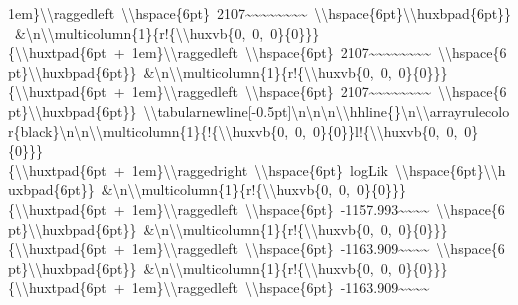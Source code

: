 \documentclass[
  english,
  man]{apa6}
\begin{document}
1em\}\textbackslash{}\textbackslash{}raggedleft\ \textbackslash{}\textbackslash{}hspace\{6pt\}\ 2107\textasciitilde{}\textasciitilde{}\textasciitilde{}\textasciitilde{}\textasciitilde{}\textasciitilde{}\textasciitilde{}\textasciitilde{}\ \textbackslash{}\textbackslash{}hspace\{6pt\}\textbackslash{}\textbackslash{}huxbpad\{6pt\}\}\ \&\textbackslash{}n\textbackslash{}\textbackslash{}multicolumn\{1\}\{r!\{\textbackslash{}\textbackslash{}huxvb\{0,\ 0,\ 0\}\{0\}\}\}\{\textbackslash{}\textbackslash{}huxtpad\{6pt\ +\ 1em\}\textbackslash{}\textbackslash{}raggedleft\ \textbackslash{}\textbackslash{}hspace\{6pt\}\ 2107\textasciitilde{}\textasciitilde{}\textasciitilde{}\textasciitilde{}\textasciitilde{}\textasciitilde{}\textasciitilde{}\textasciitilde{}\ \textbackslash{}\textbackslash{}hspace\{6pt\}\textbackslash{}\textbackslash{}huxbpad\{6pt\}\}\ \&\textbackslash{}n\textbackslash{}\textbackslash{}multicolumn\{1\}\{r!\{\textbackslash{}\textbackslash{}huxvb\{0,\ 0,\ 0\}\{0\}\}\}\{\textbackslash{}\textbackslash{}huxtpad\{6pt\ +\ 1em\}\textbackslash{}\textbackslash{}raggedleft\ \textbackslash{}\textbackslash{}hspace\{6pt\}\ 2107\textasciitilde{}\textasciitilde{}\textasciitilde{}\textasciitilde{}\textasciitilde{}\textasciitilde{}\textasciitilde{}\textasciitilde{}\ \textbackslash{}\textbackslash{}hspace\{6pt\}\textbackslash{}\textbackslash{}huxbpad\{6pt\}\}\ \textbackslash{}\textbackslash{}tabularnewline{[}-0.5pt{]}\textbackslash{}n\textbackslash{}n\textbackslash{}n\textbackslash{}\textbackslash{}hhline\{\}\textbackslash{}n\textbackslash{}\textbackslash{}arrayrulecolor\{black\}\textbackslash{}n\textbackslash{}n\textbackslash{}\textbackslash{}multicolumn\{1\}\{!\{\textbackslash{}\textbackslash{}huxvb\{0,\ 0,\ 0\}\{0\}\}l!\{\textbackslash{}\textbackslash{}huxvb\{0,\ 0,\ 0\}\{0\}\}\}\{\textbackslash{}\textbackslash{}huxtpad\{6pt\ +\ 1em\}\textbackslash{}\textbackslash{}raggedright\ \textbackslash{}\textbackslash{}hspace\{6pt\}\ logLik\ \textbackslash{}\textbackslash{}hspace\{6pt\}\textbackslash{}\textbackslash{}huxbpad\{6pt\}\}\ \&\textbackslash{}n\textbackslash{}\textbackslash{}multicolumn\{1\}\{r!\{\textbackslash{}\textbackslash{}huxvb\{0,\ 0,\ 0\}\{0\}\}\}\{\textbackslash{}\textbackslash{}huxtpad\{6pt\ +\ 1em\}\textbackslash{}\textbackslash{}raggedleft\ \textbackslash{}\textbackslash{}hspace\{6pt\}\ -1157.993\textasciitilde{}\textasciitilde{}\textasciitilde{}\textasciitilde{}\ \textbackslash{}\textbackslash{}hspace\{6pt\}\textbackslash{}\textbackslash{}huxbpad\{6pt\}\}\ \&\textbackslash{}n\textbackslash{}\textbackslash{}multicolumn\{1\}\{r!\{\textbackslash{}\textbackslash{}huxvb\{0,\ 0,\ 0\}\{0\}\}\}\{\textbackslash{}\textbackslash{}huxtpad\{6pt\ +\ 1em\}\textbackslash{}\textbackslash{}raggedleft\ \textbackslash{}\textbackslash{}hspace\{6pt\}\ -1163.909\textasciitilde{}\textasciitilde{}\textasciitilde{}\textasciitilde{}\ \textbackslash{}\textbackslash{}hspace\{6pt\}\textbackslash{}\textbackslash{}huxbpad\{6pt\}\}\ \&\textbackslash{}n\textbackslash{}\textbackslash{}multicolumn\{1\}\{r!\{\textbackslash{}\textbackslash{}huxvb\{0,\ 0,\ 0\}\{0\}\}\}\{\textbackslash{}\textbackslash{}huxtpad\{6pt\ +\ 1em\}\textbackslash{}\textbackslash{}raggedleft\ \textbackslash{}\textbackslash{}hspace\{6pt\}\ -1163.909\textasciitilde{}\textasciitilde{}\textasciitilde{}\textasciitilde{}\ 
\end{document}

